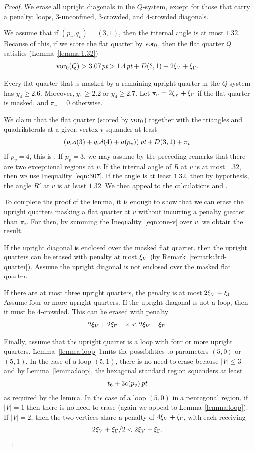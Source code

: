 \begin{proof}   We erase all upright diagonals in the
$Q$-system, except for those that carry a penalty: loops,
$3$-unconfined, $3$-crowded, and $4$-crowded diagonals.

We assume that if $(p_v,q_v)=(3,1)$, then the internal angle is at
most $1.32$. Because of this, if we score the flat quarter by
$\operatorname{vor}_0$, then the flat quarter $Q$ satisfies
(Lemma~\ref{lemma:1.32})
   \begin{equation}
   \operatorname{vor}_0(Q) > 3.07\,\hbox{\it pt} > 1.4\,\hbox{\it pt} + D(3,1) + 2\xi_V + \xi_\Gamma.
   \label{eqn:307}
   \end{equation}



Every flat quarter that is masked by a remaining upright quarter
in the $Q$-system has $y_4\ge2.6$.  Moreover, $y_1\ge2.2$ or
$y_4\ge2.7$.  Let $\pi_v = 2\xi_V + \xi_\Gamma$ if the flat quarter is
masked, and $\pi_v = 0$ otherwise.

We claim that the flat quarter (scored by $\operatorname{vor}_0$) together with
the triangles and quadrilaterals at a given vertex $v$ squander at
least
   \begin{equation}
   (p_v d(3) + q_v d(4) + a(p_v))\,\hbox{\it pt} + D(3,1) + \pi_v
   \label{eqn:one-v}
   \end{equation}
If $p_v=4$, this is .  If $p_v=3$, we may assume
by the preceding remarks that there are two exceptional regions at
$v$.  If the internal angle of $R$ at $v$ is at most $1.32$, then
we use Inequality~\ref{eqn:307}.  If the angle is at least $1.32$,
then by hypothesis, the angle $R'$ at $v$ is at least $1.32$.  We
then appeal to the calculations  and
.

To complete the proof of the lemma, it is enough to show that we
can erase the upright quarters masking a flat quarter at $v$
without incurring a penalty greater than $\pi_v$.  For then, by
summing the Inequality~\ref{eqn:one-v} over $v$, we obtain the
result.

If the upright diagonal is enclosed over the masked flat quarter,
then the upright quarters can be erased with penalty at most
$\xi_V$ (by Remark~\ref{remark:3rd-quarter}). Assume the upright
diagonal is not enclosed over the masked flat quarter.

If there are at most three upright quarters, the penalty is at
most $2\xi_V + \xi_\Gamma$.  Assume four or more upright quarters.  If
the upright diagonal is not a loop, then it must be $4$-crowded.
This can be erased with penalty
   $$2\xi_V + 2\xi_\Gamma - \kappa < 2\xi_V + \xi_\Gamma.$$

Finally, assume that the upright quarter is a loop with four or
more upright quarters.  Lemma~\ref{lemma:loop} limits the
possibilities to parameters $(5,0)$ or $(5,1)$.  In the case of a
loop $(5,1)$, there is no need to erase because $|V|\le3$ and by
Lemma~\ref{lemma:loop}, the hexagonal standard region squanders at
least
   $$t_6 + 3 a(p_v)\,\hbox{\it pt}$$
as required by the lemma.  In the case of a loop $(5,0)$ in a
pentagonal region, if $|V|=1$ then there is no need to erase
(again we appeal to Lemma~\ref{lemma:loop}).  If $|V| =2$, then
the two vertices share a penalty of $4\xi_V + \xi_\Gamma$, with each
receiving
   $$2\xi_V + \xi_\Gamma/2 < 2\xi_V +\xi_\Gamma.$$
\end{proof}
